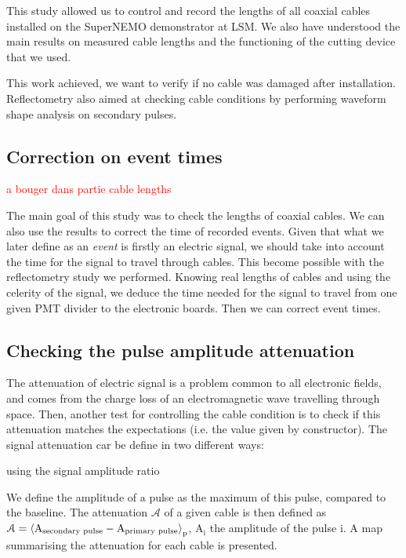 This study allowed us to control and record the lengths of all coaxial cables installed on the SuperNEMO demonstrator at LSM.
We also have understood the main results on measured cable lengths and the functioning of the cutting device that we used.

This work achieved, we want to verify if no cable was damaged after installation.
Reflectometry also aimed at checking cable conditions by performing waveform shape analysis on secondary pulses.

\subsection{Correction on event times}
\label{subsec:time_correction}

\textcolor{red}{a bouger dans partie cable lengths}

The main goal of this study was to check the lengths of coaxial cables.
We can also use the results to correct the time of recorded events.
Given that what we later define as an \emph{event} is firstly an electric signal, we should take into account the time for the signal to travel through cables.
This become possible with the reflectometry study we performed.
Knowing real lengths of cables and using the celerity of the signal, we deduce the time needed for the signal to travel from one given PMT divider to the electronic boards.
Then we can correct event times.

\subsection{Checking the pulse amplitude attenuation}
The attenuation of electric signal is a problem common to all electronic fields, and comes from the charge loss of an electromagnetic wave travelling through space.
Then, another test for controlling the cable condition is to check if this attenuation matches the expectations (i.e. the value given by constructor).
The signal attenuation car be define in two different ways:
\begin{itemize*}
\item using the signal amplitude ratio
\end{itemize*}


We define the amplitude of a pulse as the maximum of this pulse, compared to the baseline.
The attenuation $\mathcal{A}$ of a given cable is then defined as $\mathcal{A}=\braket{\text{A}_{ \text{secondary pulse}}-\text{A}_{ \text{primary pulse}}}_{\text{p}}$, $\text{A}_{\text{i}}$ the amplitude of the pulse i.
A map summarising the attenuation for each cable is presented.

